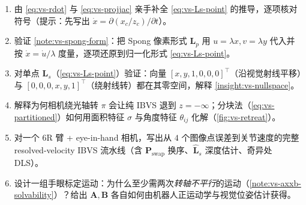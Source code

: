 \begin{practice}[复盘]
\begin{enumerate}
  \item 由 \cref{eq:vs-rdot} 与 \cref{eq:vs-projjac} 亲手补全 \cref{eq:vs-Ls-point} 的推导，逐项核对符号（提示：先写出 $\dot x=\partial(x_c/z_c)/\partial t$）。
  \item 验证 \cref{note:vs-spong-form}：把 Spong 像素形式 $\mathbf{L}_p$ 用 $u=\lambda x,v=\lambda y$ 代入并按 $\dot x=\dot u/\lambda$ 度量，逐项还原到归一化形式 \cref{eq:vs-Ls-point}。
  \item 对单点 $\mathbf{L}_s$（\cref{eq:vs-Ls-point}）验证：向量 $[x,y,1,0,0,0]^\top$（沿视觉射线平移）与 $[0,0,0,x,y,1]^\top$（绕射线转）都在其零空间，解释 \cref{insight:vs-nullspace}。
  \item 解释为何相机绕光轴转 $\pi$ 会让纯 IBVS 退到 $z=-\infty$；分块法（\cref{eq:vs-partitioned}）如何用面积特征 $\sigma$ 与角度特征 $\theta_{ij}$ 化解（\cref{fig:vs-retreat}）。
  \item 对一个 6R 臂 + eye-in-hand 相机，写出从 $4$ 个图像点误差到关节速度的完整 resolved-velocity IBVS 流水线（含 $\mathbf{P}_{\text{swap}}$ 换序、$\widehat{\mathbf{L}}_s$ 深度估计、奇异处 DLS）。
  \item 设计一组手眼标定运动：为什么至少需两次\emph{转轴不平行}的运动（\cref{note:vs-axxb-solvability}）？给出 $\mathbf{A},\mathbf{B}$ 各自如何由机器人正运动学与视觉位姿估计获得。
\end{enumerate}
\end{practice}
